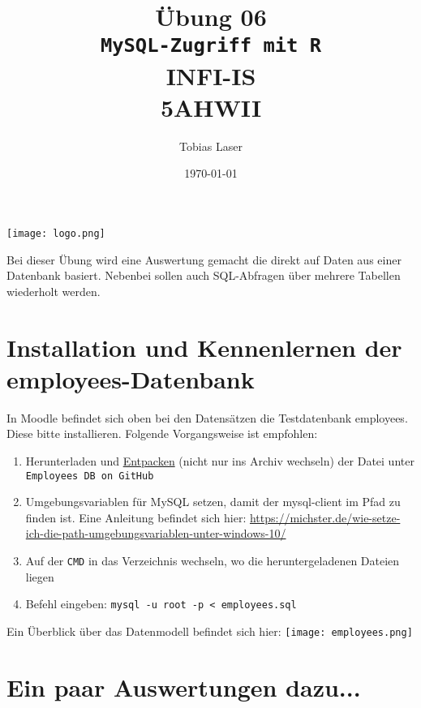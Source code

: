 \documentclass{article}
\title{Übung 06 \\ \texttt{MySQL-Zugriff mit R}  \\ INFI-IS \\ 5AHWII}
\author{Tobias Laser}
\date{\today} %
\begin{document}
	
	\maketitle %
	
	\begin{center}
		
		\texttt{[image: logo.png]}
	\end{center}
	\vspace{1cm}


Bei dieser Übung wird eine Auswertung gemacht die direkt auf Daten aus einer Datenbank basiert. Nebenbei sollen auch SQL-Abfragen über mehrere Tabellen wiederholt werden.

\section{Installation und Kennenlernen der employees-Datenbank}

In Moodle befindet sich oben bei den Datensätzen die Testdatenbank employees. Diese bitte installieren. Folgende Vorgangsweise ist empfohlen:

\begin{enumerate}
	\item Herunterladen und \underline{Entpacken} (nicht nur ins Archiv wechseln) der Datei unter \texttt{Employees DB on GitHub}
	\item Umgebungsvariablen für MySQL setzen, damit der mysql-client im Pfad zu finden ist. Eine Anleitung befindet sich hier: \url{https://michster.de/wie-setze-ich-die-path-umgebungsvariablen-unter-windows-10/}
	\item Auf der \texttt{CMD} in das Verzeichnis wechseln, wo die heruntergeladenen Dateien liegen
	\item Befehl eingeben: \texttt{mysql -u root -p < employees.sql} \\
\end{enumerate}

Ein Überblick über das Datenmodell befindet sich hier: 
\break\break
\texttt{[image: employees.png]}




\section{Ein paar Auswertungen dazu...}
\end{document}

